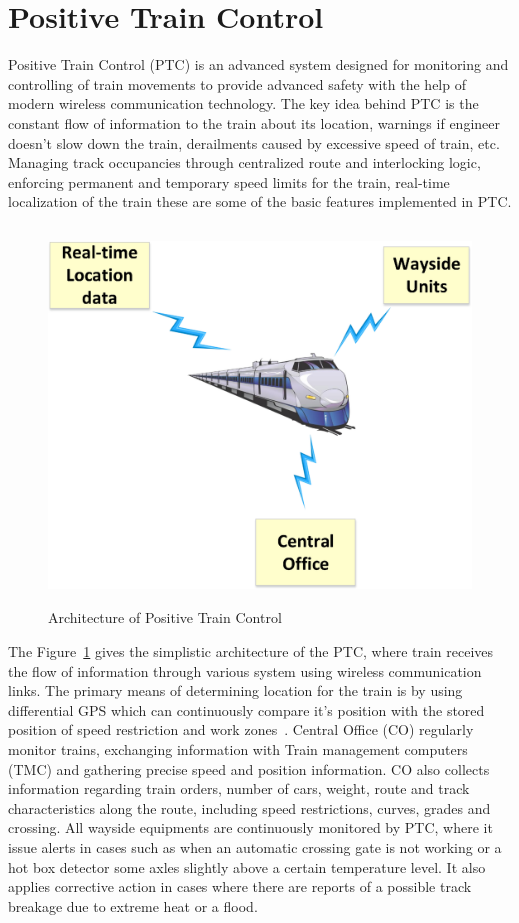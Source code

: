 \section{Positive Train Control}
Positive Train Control (PTC) is an advanced system designed for monitoring and controlling of train movements to provide advanced safety with the help of modern wireless communication technology. The key idea behind PTC is the constant flow of information to the train about its location, warnings if engineer doesn't slow down the train, derailments caused by excessive speed of train, etc. Managing track occupancies through centralized route and interlocking logic, enforcing permanent and temporary speed limits for the train, real-time localization of the train these are some of the basic features implemented in PTC. 

\begin{figure}[!ht]
\centering
\includegraphics[width=\textwidth,height=10cm,keepaspectratio]{images/Gill/5G/ptc.eps} 
\caption{Architecture of Positive Train Control}
\label{ptc}
\end{figure}


The Figure~\ref{ptc} gives the simplistic architecture of the PTC, where train receives the flow of information through various system using wireless communication links. The primary means of determining location for the train is by using differential GPS which can continuously compare it's position with the stored position of speed restriction and work zones~\cite{5338992}. Central Office (CO) regularly monitor trains, exchanging information with Train management computers (TMC) and gathering precise speed and position information. CO also collects information regarding train orders, number of cars, weight, route and track characteristics along the route, including speed restrictions, curves, grades and crossing. All wayside equipments are continuously monitored by PTC, where it issue alerts in cases such as when an automatic crossing gate is not working or a hot box detector some axles slightly above a certain temperature level. It also applies corrective action in cases where there are reports of a possible track breakage due to extreme heat or a flood.

